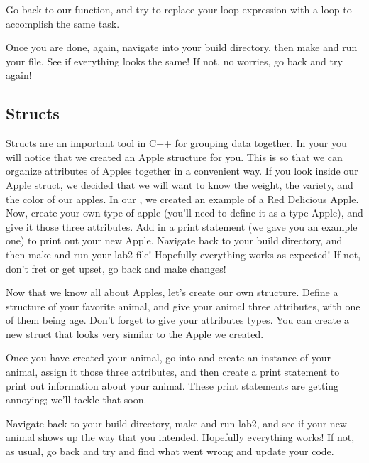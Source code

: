 \documentclass{tufte-handout}
\begin{document}
Go back to our  function, and try to replace your  loop expression with a  loop to accomplish the same task.

Once you are done, again, navigate into your build directory, then make and run your file.  See if everything looks the same!  If not, no worries, go back and try again!


\subsection{Structs}


Structs are an important tool in C++ for grouping data together.  In your  you will notice that we created an Apple structure for you.    This is so that we can organize attributes of Apples together in a convenient way.  If you look inside our Apple struct, we decided that we will want to know the weight, the variety, and the color of our apples.  In our , we created an example of a Red Delicious Apple.  Now, create your own type of apple (you'll need to define it as a type Apple), and give it those three attributes.  Add in a print statement (we gave you an example one) to print out your new Apple.  Navigate back to your build directory, and then make and run your lab2 file!  Hopefully everything works as expected!  If not, don't fret or get upset, go back and make changes!


Now that we know all about Apples, let's create our own structure.  Define a structure of your favorite animal, and give your animal three attributes, with one of them being age. Don't forget to give your attributes types. You can create a new struct that looks very similar to the Apple we created.  

Once you have created your animal, go into  and create an instance of your animal, assign it those three attributes, and then create a print statement to print out information about your animal.  These print statements are getting annoying; we'll tackle that soon.

Navigate back to your build directory, make and run lab2, and see if your new animal shows up the way that you intended.  Hopefully everything works!  If not, as usual, go back and try and find what went wrong and update your code. 
\end{document}
